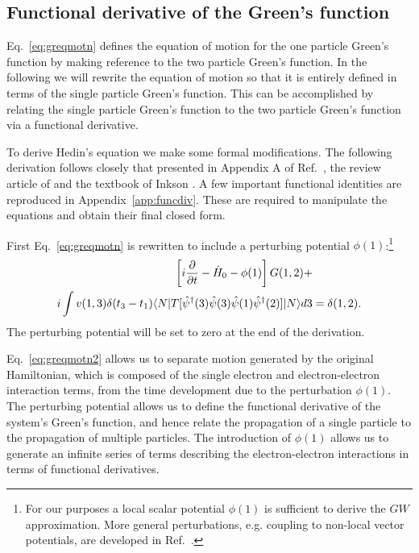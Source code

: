 \subsection{Functional derivative of the Green's function}
\noindent
Eq.~\ref{eq:greqmotn} defines the equation of motion for the one particle Green's
function by making reference to the two particle Green's function.
In the following we will rewrite the equation of motion so that it is entirely defined in
terms of the single particle Green's function. This can be
accomplished by relating the single particle Green's function to the two particle Green's
function via a functional derivative.

To derive Hedin's equation we make some formal modifications. The following derivation follows closely
that presented in Appendix A of Ref.~\cite{hedin65}, the review article of \cite{strinati88} 
and the textbook of Inkson \cite{inkson86}. A few important functional identities 
are reproduced in Appendix~\ref{app:funcdiv}. These are required to manipulate the equations 
and obtain their final closed form.

First Eq.~\ref{eq:greqmotn} is rewritten to include a perturbing potential $\phi(1)$:\footnote{For our
purposes a local scalar potential $\phi(1)$ is sufficient to derive the $GW$ approximation. More general 
perturbations, e.g. coupling to non-local vector potentials, are developed in Ref.~\cite{strinati88}.}
%
\begin{align}
\label{eq:greqmotn2}
\left[i\frac{\partial}{\partial t} - \hat{H}_{0} - \phi(1)\right]G(1,2) +& \nonumber \\
i\int v(1,3)\delta(t_{3}-t_{1})\langle N| T[\hat{\psi}^{\dagger}(3)\hat{\psi}(3)\hat{\psi}(1)\hat{\psi}^{\dagger}(2)] |N \rangle d3 &= \delta(1,2).
\end{align}
%
The perturbing potential will be set to zero at the end of the derivation.

Eq.~\ref{eq:greqmotn2} allows us to separate motion generated by the original Hamiltonian, 
which is composed of the single electron and electron-electron
interaction terms, from the time development due to the perturbation $\phi(1)$. The perturbing potential 
allows us to define the functional derivative of the system's Green's
function, and hence relate the propagation of a single particle to the propagation of multiple particles. 
The introduction of $\phi(1)$ allows us to generate an infinite series of terms 
describing the electron-electron interactions in terms of functional derivatives.

